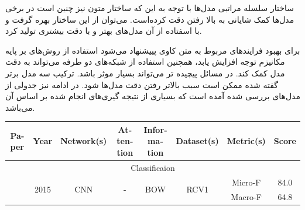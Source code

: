\documentclass[12pt, a4paper, oneside]{report}
\begin{document}
ساختار سلسله مراتبی مدل‌ها با توجه به این که ساختار متون نیز چنین است در برخی مدل‌ها کمک شایانی به
بالا رفتن دقت کرده‌است. می‌توان از این ساختار بهره گرفت و با اسفتاده از آن مدل‌های بهتر و با دقت بیشتری تولید کرد.

برای بهبود فرایندهای مربوط به متن کاوی پییشنهاد می‌شود استفاده از روش‌های بر پایه مکانیزم توجه افزایش یابد،
همچنین استفاده از شبکه‌های دو طرفه می‌تواند به دقت مدل کمک کند. در مسائل پیچیده تر
می‌تواند بسیار موثر باشد. ترکیب سه مدل برتر گفته شده ممکن است سبب بالاتر رفتن دقت مدل‌ها شود.
در ادامه نیز جدولی از مدل‌های بررسی شده آمده است که بسیاری از نتیجه گیری‌های انجام شده بر اساس آن می‌باشد.

\pagebreak

\begin{tiny}
\begin{latin}
    \begin{longtable}{|c|c|c|c|c|c|cc|}
        \hline
        Paper & Year & Network(s) & Attention & Information & Dataset(s) & Metric(s) & Score \\ \hline
        \multicolumn{8}{|c|}{Classificaion}                                                                                                                                                                                                                                                                                                                                                                                                                                        \\ \hline
        \multirow{2}{*}{\cite{johnson-zhang-2015-effective}} & \multirow{2}{*}{2015} & \multirow{2}{*}{CNN}              & \multirow{2}{*}{-}                      & \multirow{2}{*}{BOW}                                                                                   & \multirow{2}{*}{RCV1}                 & \multicolumn{1}{c|}{Micro-F}                                                                                                       & 84.0   \\ \cline{7-8} 
                                                                              &                       &                                   &                                         &                                                                                                        &                                       & \multicolumn{1}{c|}{Macro-F}                                                                                                       & 64.8   \\ \hline

\end{longtable}
\end{latin}
\end{tiny}
\end{document}

